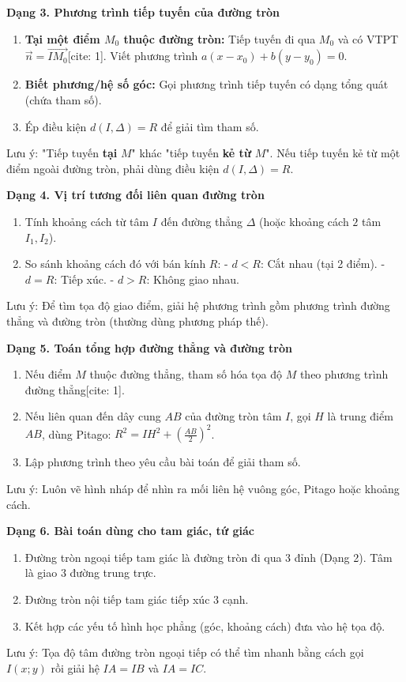 \textbf{Dạng 3. Phương trình tiếp tuyến của đường tròn}
\begin{enumerate}
\item \textbf{Tại một điểm $M_0$ thuộc đường tròn:} Tiếp tuyến đi qua $M_0$ và có VTPT $\overrightarrow{n} = \overrightarrow{IM_0}$[cite: 1]. Viết phương trình $a(x-x_0) + b(y-y_0) = 0$.
\item \textbf{Biết phương/hệ số góc:} Gọi phương trình tiếp tuyến có dạng tổng quát (chứa tham số).
\item Ép điều kiện $d(I, \Delta) = R$ để giải tìm tham số.
\end{enumerate}
Lưu ý: "Tiếp tuyến \textbf{tại} $M$" khác "tiếp tuyến \textbf{kẻ từ} $M$". Nếu tiếp tuyến kẻ từ một điểm ngoài đường tròn, phải dùng điều kiện $d(I, \Delta) = R$.

\textbf{Dạng 4. Vị trí tương đối liên quan đường tròn}
\begin{enumerate}
\item Tính khoảng cách từ tâm $I$ đến đường thẳng $\Delta$ (hoặc khoảng cách $2$ tâm $I_1, I_2$).
\item So sánh khoảng cách đó với bán kính $R$:
  - $d < R$: Cắt nhau (tại 2 điểm).
  - $d = R$: Tiếp xúc.
  - $d > R$: Không giao nhau.
\end{enumerate}
Lưu ý: Để tìm tọa độ giao điểm, giải hệ phương trình gồm phương trình đường thẳng và đường tròn (thường dùng phương pháp thế).

\textbf{Dạng 5. Toán tổng hợp đường thẳng và đường tròn}
\begin{enumerate}
\item Nếu điểm $M$ thuộc đường thẳng, tham số hóa tọa độ $M$ theo phương trình đường thẳng[cite: 1].
\item Nếu liên quan đến dây cung $AB$ của đường tròn tâm $I$, gọi $H$ là trung điểm $AB$, dùng Pitago: $R^2 = IH^2 + \left(\frac{AB}{2}\right)^2$.
\item Lập phương trình theo yêu cầu bài toán để giải tham số.
\end{enumerate}
Lưu ý: Luôn vẽ hình nháp để nhìn ra mối liên hệ vuông góc, Pitago hoặc khoảng cách.

\textbf{Dạng 6. Bài toán dùng cho tam giác, tứ giác}
\begin{enumerate}
\item Đường tròn ngoại tiếp tam giác là đường tròn đi qua $3$ đỉnh (Dạng 2). Tâm là giao $3$ đường trung trực.
\item Đường tròn nội tiếp tam giác tiếp xúc $3$ cạnh.
\item Kết hợp các yếu tố hình học phẳng (góc, khoảng cách) đưa vào hệ tọa độ.
\end{enumerate}
Lưu ý: Tọa độ tâm đường tròn ngoại tiếp có thể tìm nhanh bằng cách gọi $I(x; y)$ rồi giải hệ $IA = IB$ và $IA = IC$.


